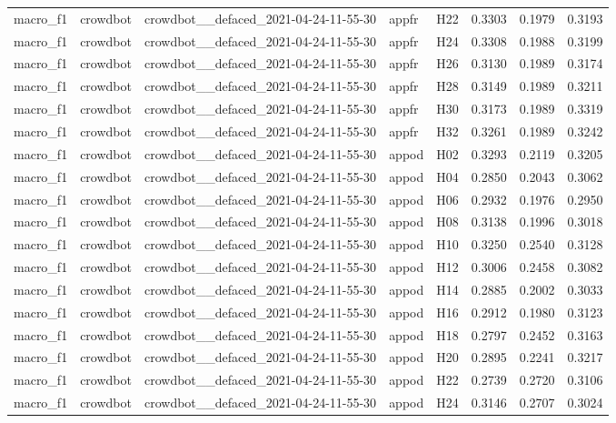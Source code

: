 \begin{table}[tbp]
\begin{tabular}{lllllrrr}
macro\_f1 & crowdbot & crowdbot\_\_defaced\_2021-04-24-11-55-30 & appfr & H22 & 0.3303 & 0.1979 & 0.3193 \\
macro\_f1 & crowdbot & crowdbot\_\_defaced\_2021-04-24-11-55-30 & appfr & H24 & 0.3308 & 0.1988 & 0.3199 \\
macro\_f1 & crowdbot & crowdbot\_\_defaced\_2021-04-24-11-55-30 & appfr & H26 & 0.3130 & 0.1989 & 0.3174 \\
macro\_f1 & crowdbot & crowdbot\_\_defaced\_2021-04-24-11-55-30 & appfr & H28 & 0.3149 & 0.1989 & 0.3211 \\
macro\_f1 & crowdbot & crowdbot\_\_defaced\_2021-04-24-11-55-30 & appfr & H30 & 0.3173 & 0.1989 & 0.3319 \\
macro\_f1 & crowdbot & crowdbot\_\_defaced\_2021-04-24-11-55-30 & appfr & H32 & 0.3261 & 0.1989 & 0.3242 \\
macro\_f1 & crowdbot & crowdbot\_\_defaced\_2021-04-24-11-55-30 & appod & H02 & 0.3293 & 0.2119 & 0.3205 \\
macro\_f1 & crowdbot & crowdbot\_\_defaced\_2021-04-24-11-55-30 & appod & H04 & 0.2850 & 0.2043 & 0.3062 \\
macro\_f1 & crowdbot & crowdbot\_\_defaced\_2021-04-24-11-55-30 & appod & H06 & 0.2932 & 0.1976 & 0.2950 \\
macro\_f1 & crowdbot & crowdbot\_\_defaced\_2021-04-24-11-55-30 & appod & H08 & 0.3138 & 0.1996 & 0.3018 \\
macro\_f1 & crowdbot & crowdbot\_\_defaced\_2021-04-24-11-55-30 & appod & H10 & 0.3250 & 0.2540 & 0.3128 \\
macro\_f1 & crowdbot & crowdbot\_\_defaced\_2021-04-24-11-55-30 & appod & H12 & 0.3006 & 0.2458 & 0.3082 \\
macro\_f1 & crowdbot & crowdbot\_\_defaced\_2021-04-24-11-55-30 & appod & H14 & 0.2885 & 0.2002 & 0.3033 \\
macro\_f1 & crowdbot & crowdbot\_\_defaced\_2021-04-24-11-55-30 & appod & H16 & 0.2912 & 0.1980 & 0.3123 \\
macro\_f1 & crowdbot & crowdbot\_\_defaced\_2021-04-24-11-55-30 & appod & H18 & 0.2797 & 0.2452 & 0.3163 \\
macro\_f1 & crowdbot & crowdbot\_\_defaced\_2021-04-24-11-55-30 & appod & H20 & 0.2895 & 0.2241 & 0.3217 \\
macro\_f1 & crowdbot & crowdbot\_\_defaced\_2021-04-24-11-55-30 & appod & H22 & 0.2739 & 0.2720 & 0.3106 \\
macro\_f1 & crowdbot & crowdbot\_\_defaced\_2021-04-24-11-55-30 & appod & H24 & 0.3146 & 0.2707 & 0.3024 \\

\end{tabular}
\end{table}
